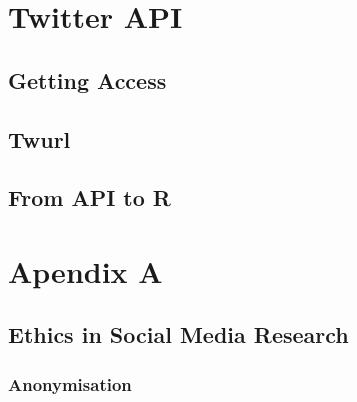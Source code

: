 \documentclass[
]{book}
\begin{document}
\hypertarget{twitter-api}{%
\chapter{Twitter API}\label{twitter-api}}

\hypertarget{getting-access}{%
\section{Getting Access}\label{getting-access}}

\hypertarget{twurl}{%
\section{Twurl}\label{twurl}}

\hypertarget{from-api-to-r}{%
\section{From API to R}\label{from-api-to-r}}

\hypertarget{apendix-a}{%
\chapter{Apendix A}\label{apendix-a}}

\hypertarget{ethics-in-social-media-research}{%
\section{Ethics in Social Media Research}\label{ethics-in-social-media-research}}

\hypertarget{anonymisation}{%
\subsection{Anonymisation}\label{anonymisation}}

  
\end{document}
